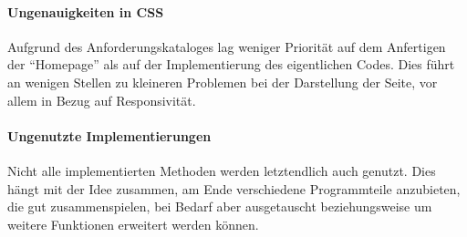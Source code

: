 		\paragraph{Ungenauigkeiten in CSS}
		Aufgrund des Anforderungskataloges lag weniger Priorität auf dem Anfertigen der "`Homepage"' als auf der Implementierung des eigentlichen Codes. Dies führt an wenigen Stellen zu kleineren Problemen bei der Darstellung der Seite, vor allem in Bezug auf Responsivität.
	
		\paragraph{Ungenutzte Implementierungen}
		Nicht alle implementierten Methoden werden letztendlich auch genutzt. Dies hängt mit der Idee zusammen, am Ende verschiedene Programmteile anzubieten, die gut zusammenspielen, bei Bedarf aber ausgetauscht be\-zie\-hungs\-weise um weitere Funktionen erweitert werden können.
